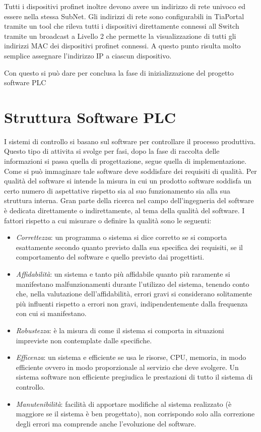 \documentclass[12pt, a4paper, oneside]{book}
\begin{document}
	
	Tutti i dispositivi profinet inoltre devono avere un indirizzo di rete univoco ed essere nella stessa SubNet. Gli indirizzi di rete sono configurabili in TiaPortal tramite un tool che rileva tutti i dispositivi direttamente connessi all Switch tramite un broadcast a Livello 2 che permette la visualizzazione di tutti gli indirizzi MAC dei dispositivi profinet connessi. A questo punto risulta molto semplice assegnare l'indirizzo IP a ciascun dispositivo.
	
	Con questo si può dare per conclusa la fase di inizializzazione del progetto software PLC

\section{Struttura Software PLC}

I sistemi di controllo si basano sul software per controllare il processo produttiva. Questo tipo di attivita si svolge per fasi, dopo la fase di raccolta delle informazioni si passa quella di progettazione, segue quella di implementazione. Come si può immaginare tale software deve soddisfare dei requisiti di qualità. Per qualità del software si intende la misura in cui un prodotto software soddisfa un certo numero di aspettative rispetto sia al suo funzionamento sia alla sua struttura interna. Gran parte della ricerca nel campo dell'ingegneria del software è dedicata direttamente o indirettamente, al tema della qualità del software. I fattori rispetto a cui misurare o definire la qualità sono le seguenti: 
\begin{itemize}
	\item \textit{Correttezza}: un programma o sistema si dice corretto se si comporta esattamente secondo quanto previsto dalla sua specifica dei requisiti,  se il comportamento del software e quello previsto dai progettisti.  
	\item \textit{Affidabilità}: un sistema e tanto più affidabile quanto più raramente si manifestano malfunzionamenti durante l'utilizzo del sistema, tenendo conto che, nella valutazione dell'affidabilità, errori gravi si considerano solitamente più influenti rispetto a errori non gravi, indipendentemente dalla frequenza con cui si manifestano.
	\item \textit{Robustezza}: è la misura di come il sistema si comporta in situazioni impreviste non contemplate dalle specifiche. 
	\item \textit{Efficenza}: un sistema e efficiente se usa le risorse, CPU, memoria, in modo efficiente ovvero in modo proporzionale al servizio che deve svolgere. Un sistema software non efficiente pregiudica le prestazioni di tutto il sistema di controllo.
	\item \textit{Manutenibilità}: facilità di apportare modifiche al sistema realizzato (è maggiore se il sistema è ben progettato),  non corrispondo solo alla correzione degli errori ma comprende anche l'evoluzione del software.
\end{itemize}
\end{document}

